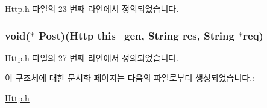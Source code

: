 Http.\-h 파일의 23 번째 라인에서 정의되었습니다.

\hypertarget{struct___http_a451c690a3b05c1c9ee2af0cc6903b9d7}{
\subsubsection[{Post}]{\setlength{\rightskip}{0pt plus 5cm}void($\ast$  Post)({\bf Http} this\-\_\-gen, {\bf String} res, {\bf String} $\ast$req)}}\label{struct___http_a451c690a3b05c1c9ee2af0cc6903b9d7}


Http.\-h 파일의 27 번째 라인에서 정의되었습니다.



이 구조체에 대한 문서화 페이지는 다음의 파일로부터 생성되었습니다.\-:\begin{DoxyCompactItemize}
\item 
\hyperlink{_http_8h}{Http.\-h}\end{DoxyCompactItemize}

